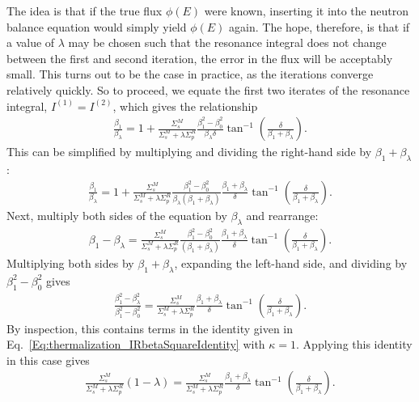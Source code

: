 The idea is that if the true flux $\phi(E)$ were known, inserting it into the neutron balance equation would simply yield $\phi(E)$ again. The hope, therefore, is that if a value of $\lambda$ may be chosen such that the resonance integral does not change between the first and second iteration, the error in the flux will be acceptably small. This turns out to be the case in practice, as the iterations converge relatively quickly. So to proceed, we equate the first two iterates of the resonance integral, $I^{(1)} = I^{(2)}$, which gives the relationship
\begin{align}
  \frac{\beta_1}{\beta_\lambda} = 1 + \frac{\Sigma_s^M}{\Sigma_s^M + \lambda \Sigma_p^R } \frac{  \beta_1^2 - \beta_0^2 }{ \beta_\lambda \delta } \tan^{-1} \left( \frac{\delta}{\beta_1 + \beta_\lambda} \right) .
\end{align}
This can be simplified by multiplying and dividing the right-hand side by $\beta_1 + \beta_\lambda$:
\begin{align}
  \frac{\beta_1}{\beta_\lambda} = 1 + \frac{\Sigma_s^M}{\Sigma_s^M + \lambda \Sigma_p^R } \frac{  \beta_1^2 - \beta_0^2 }{ \beta_\lambda (\beta_1 + \beta_\lambda) } \frac{\beta_1 + \beta_\lambda}{\delta} \tan^{-1} \left( \frac{\delta}{\beta_1 + \beta_\lambda} \right) .
\end{align}
Next, multiply both sides of the equation by $\beta_\lambda$ and rearrange:
\begin{align}
  \beta_1 - \beta_\lambda = \frac{\Sigma_s^M}{\Sigma_s^M + \lambda \Sigma_p^R } \frac{  \beta_1^2 - \beta_0^2 }{(\beta_1 + \beta_\lambda) } \frac{\beta_1 + \beta_\lambda}{\delta} \tan^{-1} \left( \frac{\delta}{\beta_1 + \beta_\lambda} \right) .
\end{align}
Multiplying both sides by $\beta_1 + \beta_\lambda$, expanding the left-hand side, and dividing by $\beta_1^2 - \beta_0^2$ gives
\begin{align}
  \frac{\beta_1^2 - \beta_\lambda^2}{\beta_1^2 - \beta_0^2} 
  = \frac{\Sigma_s^M}{\Sigma_s^M + \lambda \Sigma_p^R } \frac{\beta_1 + \beta_\lambda}{\delta} \tan^{-1} \left( \frac{\delta}{\beta_1 + \beta_\lambda} \right) .
\end{align}
By inspection, this contains terms in the identity given in Eq.~\eqref{Eq:thermalization_IRbetaSquareIdentity} with $\kappa = 1$. Applying this identity in this case gives
\begin{align}
  \frac{\Sigma_s^M}{\Sigma_s^M + \lambda \Sigma_p^R } ( 1 - \lambda )
  = \frac{\Sigma_s^M}{\Sigma_s^M + \lambda \Sigma_p^R } \frac{\beta_1 + \beta_\lambda}{\delta} \tan^{-1} \left( \frac{\delta}{\beta_1 + \beta_\lambda} \right) .
\end{align}


